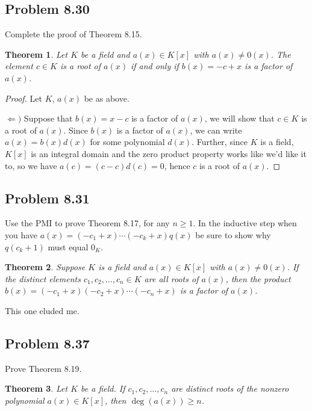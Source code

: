 \documentclass[letterpaper, 12pt]{amsart}
\newtheorem{thm}{Theorem}
\begin{document}
	\subsection*{Problem 8.30}
	\label{sub:probem_8_30}
	Complete the proof of Theorem 8.15.
	\setcounter{thm}{14}
		\begin{thm}
		Let $K$ be a field and $a(x) \in K[x]$ with $a(x) \neq 0(x)$. 
		The element $c \in K$ is a root of $a(x)$ if and only if $b(x) = -c + x$ is a factor of $a(x)$.
		\end{thm}

		\begin{proof}
		Let $K$, $a(x)$ be as above.

		$\Leftarrow)$ Suppose that $b(x) = x - c$ is a factor of $a(x)$, we will show that $c \in K$ is a root of $a(x)$.
		Since $b(x)$ is a factor of $a(x)$, we can write $a(x) = b(x)d(x)$ for some polynomial $d(x)$.
		Further, since $K$ is a field, $K[x]$ is an integral domain and the zero product property works like we'd like it to, so we have $a(c) = (c - c)d(c) = 0$, hence $c$ is a root of $a(x)$.
		\end{proof}

	\subsection*{Problem 8.31}
	\label{sub:probem_8_31}
	Use the PMI to prove Theorem 8.17, for any $n \geq 1$. 
	In the inductive step when you have $a(x) = (-c_{1} + x) \cdots (-c_{k} + x)q(x)$ be sure to show why $q(c_{k}+1)$ must equal $0_{K}$.
	\setcounter{thm}{16}
		\begin{thm}
		Suppose $K$ is a field and $a(x) \in K[x]$ with $a(x) \neq 0(x)$. 
		If the distinct elements $c_{1}, c_{2}, \dots, c_{n} \in K$ are all roots of $a(x)$, then the product $b(x) = (-c_{1} + x)(-c_{2} + x) \cdots (-c_{n} + x)$ is a factor of $a(x)$.
		\end{thm}

		This one eluded me.

	\subsection*{Problem 8.37}
	\label{sub:probem_8_37}
	Prove Theorem 8.19.
	\setcounter{thm}{18}
		\begin{thm}
		Let $K$ be a field. 
		If $c_{1}, c_{2}, \dots, c_{n}$ are distinct roots of the nonzero polynomial $a(x) \in K[x]$, then $\deg(a(x)) \geq n$.
		\end{thm}
\end{document}
